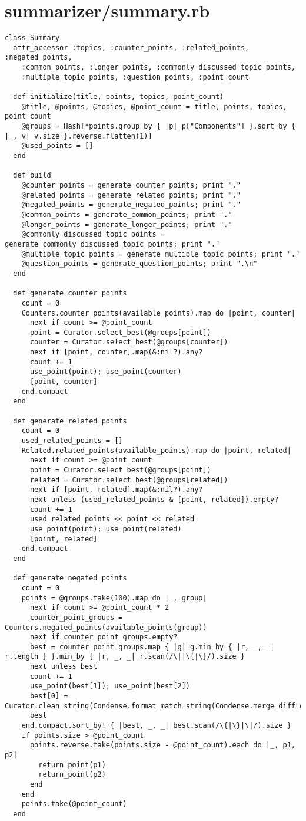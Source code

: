 \documentclass{article}
\begin{document}
\section*{summarizer/summary.rb}
\begin{verbatim}
class Summary
  attr_accessor :topics, :counter_points, :related_points, :negated_points,
    :common_points, :longer_points, :commonly_discussed_topic_points,
    :multiple_topic_points, :question_points, :point_count

  def initialize(title, points, topics, point_count)
    @title, @points, @topics, @point_count = title, points, topics, point_count
    @groups = Hash[*points.group_by { |p| p["Components"] }.sort_by { |_, v| v.size }.reverse.flatten(1)]
    @used_points = []
  end

  def build
    @counter_points = generate_counter_points; print "."
    @related_points = generate_related_points; print "."
    @negated_points = generate_negated_points; print "."
    @common_points = generate_common_points; print "."
    @longer_points = generate_longer_points; print "."
    @commonly_discussed_topic_points = generate_commonly_discussed_topic_points; print "."
    @multiple_topic_points = generate_multiple_topic_points; print "."
    @question_points = generate_question_points; print ".\n"
  end

  def generate_counter_points
    count = 0
    Counters.counter_points(available_points).map do |point, counter|
      next if count >= @point_count
      point = Curator.select_best(@groups[point])
      counter = Curator.select_best(@groups[counter])
      next if [point, counter].map(&:nil?).any?
      count += 1
      use_point(point); use_point(counter)
      [point, counter]
    end.compact
  end

  def generate_related_points
    count = 0
    used_related_points = []
    Related.related_points(available_points).map do |point, related|
      next if count >= @point_count
      point = Curator.select_best(@groups[point])
      related = Curator.select_best(@groups[related])
      next if [point, related].map(&:nil?).any?
      next unless (used_related_points & [point, related]).empty?
      count += 1
      used_related_points << point << related
      use_point(point); use_point(related)
      [point, related]
    end.compact
  end

  def generate_negated_points
    count = 0
    points = @groups.take(100).map do |_, group|
      next if count >= @point_count * 2
      counter_point_groups = Counters.negated_points(available_points(group))
      next if counter_point_groups.empty?
      best = counter_point_groups.map { |g| g.min_by { |r, _, _| r.length } }.min_by { |r, _, _| r.scan(/\||\{|\}/).size }
      next unless best
      count += 1
      use_point(best[1]); use_point(best[2])
      best[0] = Curator.clean_string(Condense.format_match_string(Condense.merge_diff_groups(best.first)))
      best
    end.compact.sort_by! { |best, _, _| best.scan(/\{|\}|\|/).size }
    if points.size > @point_count
      points.reverse.take(points.size - @point_count).each do |_, p1, p2|
        return_point(p1)
        return_point(p2)
      end
    end
    points.take(@point_count)
  end


\end{verbatim}
\end{document}
